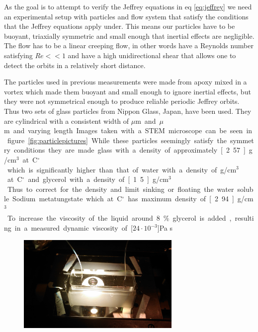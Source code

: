 As the goal is to attempt to verify the Jeffrey equations in eq \ref{eq:jeffrey} we need an experimental setup with 
particles and flow system that satisfy the conditions that the Jeffrey equations apply under. This means our particles 
have to be buoyant, triaxially symmetric and small enough that inertial effects are negligible. The flow has to be a 
linear creeping flow, in other words have a Reynolds number satisfying $Re << 1$ and have a high unidirectional shear 
that allows one to detect the orbits in a relatively short distance.


The particles used in previous measurements were made from apoxy mixed in a vortex\cite{JonasExperiment} which made 
them buoyant and small enough to ignore inertial effects, but they were not symmetrical enough to produce reliable 
periodic Jeffrey orbits. Thus two sets of glass particles from Nippon Glass, Japan\cite{Particles}, have been used. 
They are cylindrical with a consistent width of \unit[3]{$\mu$m} and \unit[5]{$\mu$m} and varying length. Images taken 
with a STEM microscope can be seen in figure \ref{fig:particlepictures}. 




While these particles seemingly satisfy the symmetry conditions they are made glass with a density of approximately \unit[2.57]{g/cm$^3$} at \unit[20]{C$^\circ$} which is significantly higher than that of water with a density of \unit[1]{g/cm$^3$} at \unit[20]{C$^\circ$} and glycerol with a density of \unit[1.5]{g/cm$^3$}. Thus to correct for the density and limit sinking or floating the water soluble Sodium metatungstate which at \unit[20]{C$^\circ$} has maximum density of \unit[2.94]{g/cm$^3$}. To increase the viscosity of the liquid around 8\% glycerol is added, resulting in a measured dynamic viscosity of \unit[$24\cdot 10^{-3}$]{Pa s}

\begin{figure}[H]
\centering
\includegraphics[width=0.7\textwidth]{figures/method/ChannelZoomed.jpg}
\end{figure}


